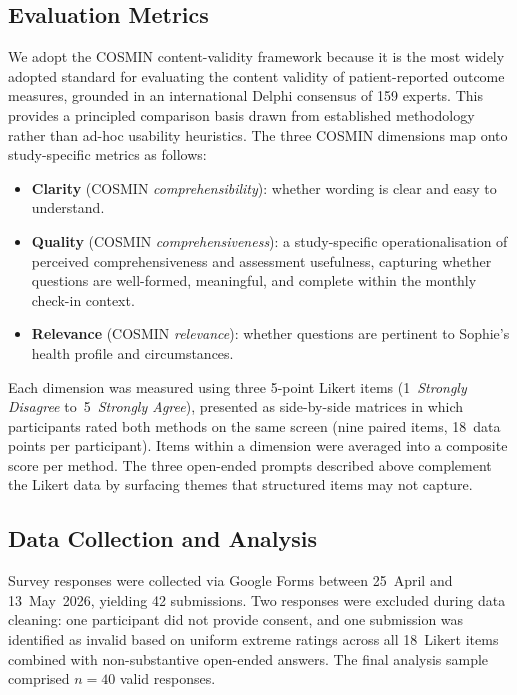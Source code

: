 \documentclass[conference]{IEEEtran}
\begin{document}
\subsection{Evaluation Metrics}
\label{subsec:metrics}

We adopt the COSMIN content-validity framework \cite{terwee2018}
because it is the most widely adopted standard for evaluating the
content validity of patient-reported outcome measures, grounded in an
international Delphi consensus of 159 experts. This provides a
principled comparison basis drawn from established methodology rather
than ad-hoc usability heuristics. The three COSMIN dimensions map onto
study-specific metrics as follows:

\begin{itemize}
  \item \textbf{Clarity} (COSMIN \emph{comprehensibility}): whether
        wording is clear and easy to understand.
  \item \textbf{Quality} (COSMIN \emph{comprehensiveness}): a
        study-specific operationalisation of perceived
        comprehensiveness and assessment usefulness, capturing whether
        questions are well-formed, meaningful, and complete within the
        monthly check-in context.
  \item \textbf{Relevance} (COSMIN \emph{relevance}): whether questions
        are pertinent to Sophie's health profile and circumstances.
\end{itemize}

Each dimension was measured using three 5-point Likert items
(1~\emph{Strongly Disagree} to~5~\emph{Strongly Agree}), presented as
side-by-side matrices in which participants rated both methods on the
same screen (nine paired items, 18~data points per participant). Items
within a dimension were averaged into a composite score per method. The
three open-ended prompts described above complement the Likert data by
surfacing themes that structured items may not capture.

\subsection{Data Collection and Analysis}
\label{subsec:data_collection}

Survey responses were collected via Google Forms between 25~April and
13~May~2026, yielding 42 submissions. Two responses were excluded during
data cleaning: one participant did not provide consent, and one submission
was identified as invalid based on uniform extreme ratings across all
18~Likert items combined with non-substantive open-ended answers.
The final analysis sample comprised $n = 40$ valid responses.
\end{document}
